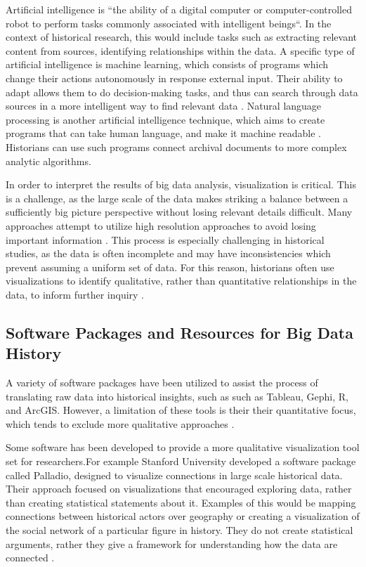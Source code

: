 \documentclass[sigconf]{acmart}
\begin{document}
Artificial intelligence is ``the ability of a digital computer or computer-controlled robot to perform tasks commonly associated with intelligent beings``\cite{aidef}. In the context of historical research, this would include tasks such as extracting relevant content from sources, identifying relationships within the data. A specific type of artificial intelligence is machine learning, which consists of programs which change their actions autonomously in response external input. Their ability to adapt allows them to do decision-making tasks, and thus can search through data sources in a more intelligent way to find relevant data \cite{bdsurvey}. Natural language processing is another artificial intelligence technique, which aims to create programs that can take human language, and make it machine readable \cite{natlangdef}. Historians can use such programs connect archival documents to more complex analytic algorithms.

In order to interpret the results of big data analysis, visualization is critical. This is a challenge, as the large scale of the data makes striking a balance between a sufficiently big picture perspective without losing relevant details difficult. Many approaches attempt to utilize high resolution approaches to avoid losing important information \cite{bdsurvey}. This process is especially challenging in historical studies, as the data is often incomplete and may have inconsistencies which prevent assuming a uniform set of data. For this reason, historians often use visualizations to identify qualitative, rather than quantitative relationships in the data, to inform further inquiry \cite{digitalrepublicletters}.

\subsection{Software Packages and Resources for Big Data History}
A variety of software packages have been utilized to assist the process of translating raw data into historical insights, such as such as Tableau, Gephi, R, and ArcGIS. However, a limitation of these tools is their their quantitative focus, which tends to exclude more qualitative approaches \cite{digitalrepublicletters}. 

Some software has been developed to provide a more qualitative visualization tool set for researchers.For example Stanford University developed a software package called Palladio, designed to visualize connections in large scale historical data. Their approach focused on visualizations that encouraged exploring data, rather than creating statistical statements about it. Examples of this would be mapping connections between historical actors over geography or creating a visualization of the social network of a particular figure in history. They do not create statistical arguments, rather they give a framework for understanding how the data are connected \cite{palladio}.
\end{document}
